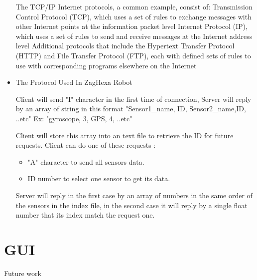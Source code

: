 \begin{itemize}
			The TCP/IP Internet protocols, a common example, consist of:
			Transmission Control Protocol (TCP), which uses a set of rules to exchange messages with other Internet points at the information packet level
			Internet Protocol (IP), which uses a set of rules to send and receive messages at the Internet address level
			Additional protocols that include the Hypertext Transfer Protocol (HTTP) and File Transfer Protocol (FTP), each with defined sets of rules to use with corresponding programs elsewhere on the Internet
			
			\item The Protocol Used In ZagHexa Robot
			
			Client will send "I" character in the first time of connection, Server will reply by an array of string in this format {"Sensor1\_name, ID, Sensor2\_name,ID, ..etc"}
			Ex:	{"gyroscope, 3, GPS, 4, ..etc"}
			
			Client will store this array into an text file to retrieve the ID for future requests.
			Client can do one of these requests :
			\begin{itemize}
				\item "A" character  to send all sensors data.
				\item ID number to select one sensor to get its data.
			\end{itemize}
				
			Server will reply in the first case by an array of numbers in the same order of the sensors in the index file, in the second case it will reply by a single float number that its index match the request one.
			
		\end{itemize}
		
\section{GUI}

Future work